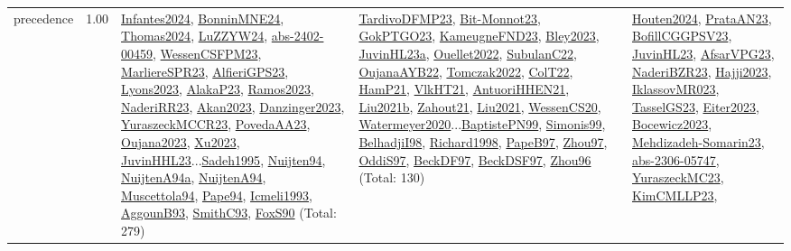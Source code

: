 {\begin{longtable}{p{3cm}r>{\raggedright\arraybackslash}p{6cm}>{\raggedright\arraybackslash}p{6cm}>{\raggedright\arraybackslash}p{8cm}}
\index{precedence}\index{Concepts!precedence}precedence &  1.00 & \hyperref[detail:Infantes2024]{Infantes2024}, \hyperref[detail:BonninMNE24]{BonninMNE24}, \hyperref[detail:Thomas2024]{Thomas2024}, \hyperref[detail:LuZZYW24]{LuZZYW24}, \hyperref[detail:abs-2402-00459]{abs-2402-00459}, \hyperref[detail:WessenCSFPM23]{WessenCSFPM23}, \hyperref[detail:MarliereSPR23]{MarliereSPR23}, \hyperref[detail:AlfieriGPS23]{AlfieriGPS23}, \hyperref[detail:Lyons2023]{Lyons2023}, \hyperref[detail:AlakaP23]{AlakaP23}, \hyperref[detail:Ramos2023]{Ramos2023}, \hyperref[detail:NaderiRR23]{NaderiRR23}, \hyperref[detail:Akan2023]{Akan2023}, \hyperref[detail:Danzinger2023]{Danzinger2023}, \hyperref[detail:YuraszeckMCCR23]{YuraszeckMCCR23}, \hyperref[detail:PovedaAA23]{PovedaAA23}, \hyperref[detail:Oujana2023]{Oujana2023}, \hyperref[detail:Xu2023]{Xu2023}, \hyperref[detail:JuvinHHL23]{JuvinHHL23}...\hyperref[detail:Sadeh1995]{Sadeh1995}, \hyperref[detail:Nuijten94]{Nuijten94}, \hyperref[detail:NuijtenA94a]{NuijtenA94a}, \hyperref[detail:NuijtenA94]{NuijtenA94}, \hyperref[detail:Muscettola94]{Muscettola94}, \hyperref[detail:Pape94]{Pape94}, \hyperref[detail:Icmeli1993]{Icmeli1993}, \hyperref[detail:AggounB93]{AggounB93}, \hyperref[detail:SmithC93]{SmithC93}, \hyperref[detail:FoxS90]{FoxS90} (Total: 279) & \hyperref[detail:TardivoDFMP23]{TardivoDFMP23}, \hyperref[detail:Bit-Monnot23]{Bit-Monnot23}, \hyperref[detail:GokPTGO23]{GokPTGO23}, \hyperref[detail:KameugneFND23]{KameugneFND23}, \hyperref[detail:Bley2023]{Bley2023}, \hyperref[detail:JuvinHL23a]{JuvinHL23a}, \hyperref[detail:Ouellet2022]{Ouellet2022}, \hyperref[detail:SubulanC22]{SubulanC22}, \hyperref[detail:OujanaAYB22]{OujanaAYB22}, \hyperref[detail:Tomczak2022]{Tomczak2022}, \hyperref[detail:ColT22]{ColT22}, \hyperref[detail:HamP21]{HamP21}, \hyperref[detail:VlkHT21]{VlkHT21}, \hyperref[detail:AntuoriHHEN21]{AntuoriHHEN21}, \hyperref[detail:Liu2021b]{Liu2021b}, \hyperref[detail:Zahout21]{Zahout21}, \hyperref[detail:Liu2021]{Liu2021}, \hyperref[detail:WessenCS20]{WessenCS20}, \hyperref[detail:Watermeyer2020]{Watermeyer2020}...\hyperref[detail:BaptistePN99]{BaptistePN99}, \hyperref[detail:Simonis99]{Simonis99}, \hyperref[detail:BelhadjiI98]{BelhadjiI98}, \hyperref[detail:Richard1998]{Richard1998}, \hyperref[detail:PapeB97]{PapeB97}, \hyperref[detail:Zhou97]{Zhou97}, \hyperref[detail:OddiS97]{OddiS97}, \hyperref[detail:BeckDF97]{BeckDF97}, \hyperref[detail:BeckDSF97]{BeckDSF97}, \hyperref[detail:Zhou96]{Zhou96} (Total: 130) & \hyperref[detail:Houten2024]{Houten2024}, \hyperref[detail:PrataAN23]{PrataAN23}, \hyperref[detail:BofillCGGPSV23]{BofillCGGPSV23}, \hyperref[detail:JuvinHL23]{JuvinHL23}, \hyperref[detail:AfsarVPG23]{AfsarVPG23}, \hyperref[detail:NaderiBZR23]{NaderiBZR23}, \hyperref[detail:Hajji2023]{Hajji2023}, \hyperref[detail:IklassovMR023]{IklassovMR023}, \hyperref[detail:TasselGS23]{TasselGS23}, \hyperref[detail:Eiter2023]{Eiter2023}, \hyperref[detail:Bocewicz2023]{Bocewicz2023}, \hyperref[detail:Mehdizadeh-Somarin23]{Mehdizadeh-Somarin23}, \hyperref[detail:abs-2306-05747]{abs-2306-05747}, \hyperref[detail:YuraszeckMC23]{YuraszeckMC23}, \hyperref[detail:KimCMLLP23]{KimCMLLP23}, 
\end{longtable}}
